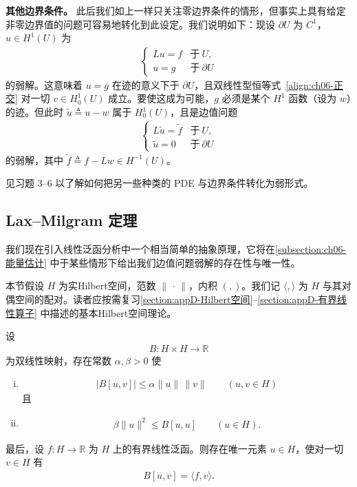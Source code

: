 \documentclass[../../main.tex]{subfiles}
\begin{document}
\textbf{其他边界条件。} 此后我们如上一样只关注零边界条件的情形，但事实上具有给定非零边界值的问题可容易地转化到此设定。我们说明如下：现设 $\partial U$ 为 $C^{1}$，$u\in H^{1}(U)$ 为
\begin{align*}
\begin{cases}
Lu=f & \text{于}\ U,\\
u=g & \text{于}\ \partial U
\end{cases}
\end{align*}
的弱解。这意味着 $u=g$ 在迹的意义下于 $\partial U$，且双线性型恒等式~\eqref{align:ch06-正交} 对一切 $v\in H^{1}_{0}(U)$ 成立。要使这成为可能，$g$ 必须是某个 $H^{1}$ 函数（设为 $w$）的迹。但此时 $\widetilde{u}\triangleq u-w$ 属于 $H^{1}_{0}(U)$，且是边值问题
\begin{align*}
\begin{cases}
L\widetilde{u}=\widetilde{f} & \text{于}\ U,\\
\widetilde{u}=0 & \text{于}\ \partial U
\end{cases}
\end{align*}
的弱解，其中 $\widetilde{f}\triangleq f-Lw\in H^{-1}(U)$。

见习题 3--6 以了解如何把另一些种类的 PDE 与边界条件转化为弱形式。

\subsection{Lax--Milgram 定理}\label{subsection:ch06-LaxMilgram}

我们现在引入线性泛函分析中一个相当简单的抽象原理，它将在\cref{subsection:ch06-能量估计} 中于某些情形下给出我们边值问题弱解的存在性与唯一性。

本节假设 $H$ 为实Hilbert空间，范数 $\|\,\cdot\,\|$，内积 $(,)$。我们记 $\langle,\rangle$ 为 $H$ 与其对偶空间的配对。读者应按需复习\cref{section:appD-Hilbert空间}--\cref{section:appD-有界线性算子} 中描述的基本Hilbert空间理论。

\begin{theorem}\label{theorem:ch06-LaxMilgram}设
\begin{align*}
B:H\times H\to\mathbb{R}
\end{align*}
为双线性映射，存在常数 $\alpha,\beta>0$ 使
\begin{enumerate}[(i)]
\item
\begin{align*}
|B[u,v]|\leqslant\alpha\|u\|\,\|v\|\qquad (u,v\in H)
\end{align*}
且
\item
\begin{align*}
\beta\|u\|^{2}\leqslant B[u,u]\qquad (u\in H).
\end{align*}
\end{enumerate}
最后，设 $f:H\to\mathbb{R}$ 为 $H$ 上的有界线性泛函。则存在唯一元素 $u\in H$，使对一切 $v\in H$ 有
\begin{align}
B[u,v]=\langle f,v\rangle.
\end{align}
\end{theorem}
\end{document}
